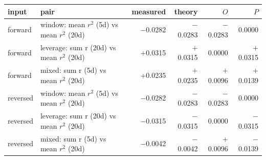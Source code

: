 \begin{tabular}{llrrrr}\toprule input & pair & measured & theory & $O$ & $P$\\\midrule
forward & window: mean $r^2$ (5d) vs mean $r^2$ (20d) & $-$0.0282 & $-$0.0283 & $-$0.0283 & 0.0000\\
forward & leverage: sum r (20d) vs mean $r^2$ (20d) & $+$0.0315 & $+$0.0315 & 0.0000 & $+$0.0315\\
forward & mixed: sum r (5d) vs mean $r^2$ (20d) & $+$0.0235 & $+$0.0235 & $+$0.0096 & $+$0.0139\\
reversed & window: mean $r^2$ (5d) vs mean $r^2$ (20d) & $-$0.0282 & $-$0.0283 & $-$0.0283 & 0.0000\\
reversed & leverage: sum r (20d) vs mean $r^2$ (20d) & $-$0.0315 & $-$0.0315 & 0.0000 & $-$0.0315\\
reversed & mixed: sum r (5d) vs mean $r^2$ (20d) & $-$0.0042 & $-$0.0042 & $+$0.0096 & $-$0.0139\\
\bottomrule\end{tabular}
